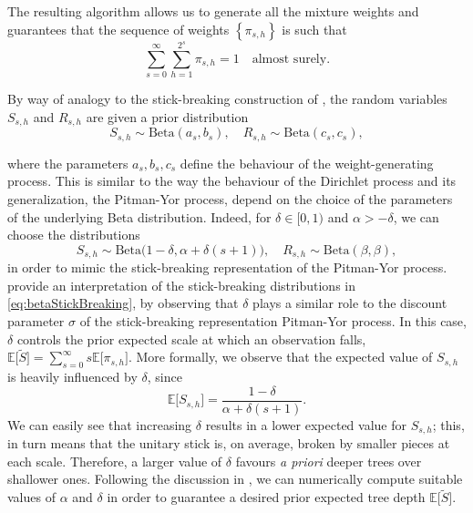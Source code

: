 \documentclass[nonatbib]{elsarticle}
\begin{document}
The resulting algorithm allows us to generate all the mixture weights and guarantees that the sequence of weights $\left\{ \pi_{s,h} \right\}$ is such that \autocite{canale2016b}
\[
    \sum_{s=0}^{\infty }\sum_{h=1}^{2^{s}} \pi_{s,h} = 1 \quad \text{almost surely}.
\]



By way of analogy to the stick-breaking construction of \textcite{ishwaran2001}, the random variables $S_{s,h}$ and $R_{s,h}$ are given a prior distribution
\[
    S_{s,h} \sim \text{Beta}(a_s, b_s), \quad R_{s,h} \sim \text{Beta}(c_s, c_s),
\]


where the parameters $a_s, b_s, c_s$ define the behaviour of the weight-generating process.
This is similar to the way the behaviour of the Dirichlet process and its generalization, the Pitman-Yor process, depend on the choice of the parameters of the underlying Beta distribution.
Indeed, for $\delta \in [0,1) $ and $\alpha > -\delta$, we can choose the distributions
\begin{equation}
    \label{eq:betaStickBreaking}
    S_{s,h} \sim \text{Beta}\big(1 - \delta, \alpha + \delta(s+1)\big), \quad R_{s,h} \sim \text{Beta}(\beta,\beta),
\end{equation}
in order to mimic the stick-breaking representation of the Pitman-Yor process.
\textcite{stefanucci2021} provide an interpretation of the stick-breaking distributions in \eqref{eq:betaStickBreaking}, by observing that $\delta$ plays a similar role to the discount parameter $\sigma$ of the stick-breaking representation Pitman-Yor process.
In this case, $\delta$ controls the prior expected scale at which an observation falls, $\mathbb{E}\big[ \tilde{S} \big] = \sum_{s=0}^{\infty }s \mathbb{E}\big[ \pi_{s,h} \big]$.
More formally, we observe that the expected value of $S_{s,h}$ is heavily influenced by $\delta$, since
\[
    \mathbb{E}\big[ S_{s,h} \big] = \frac{1 - \delta}{\alpha + \delta(s+1)}.
\]
We can easily see that increasing $\delta$ results in a lower expected value for $S_{s,h}$; this, in turn means that the unitary stick is, on average, broken by smaller pieces at each scale.
Therefore, a larger value of $\delta$ favours \textit{a priori} deeper trees over shallower ones.
Following the discussion in \textcite{stefanucci2021}, we can numerically compute suitable values of $\alpha$ and $\delta$ in order to guarantee a desired prior expected tree depth $\mathbb{E}\big[ \tilde{S} \big].$
\end{document}
